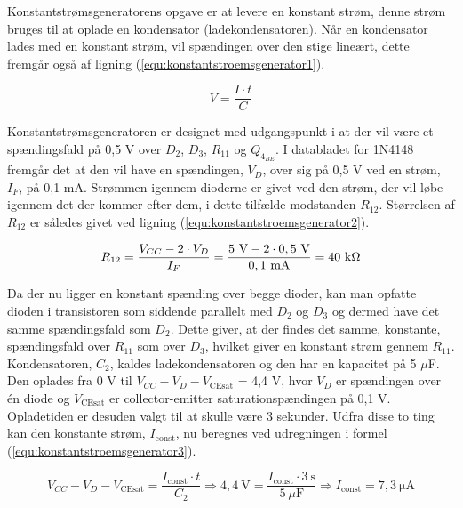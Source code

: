 Konstantstrømsgeneratorens opgave er at levere en konstant strøm, denne strøm bruges til at oplade en kondensator (ladekondensatoren). Når en kondensator lades med en konstant strøm, vil spændingen over den stige lineært, dette fremgår også af ligning (\ref{equ:konstantstroemsgenerator1}).

\begin{equation}
\label{equ:konstantstroemsgenerator1}
V = \frac{I \cdot t}{C}
\end{equation}

Konstantstrømsgeneratoren er designet med udgangspunkt i at der vil være et spændingsfald på 0,5 V over $D_2$, $D_3$, $R_{11}$ og $Q_{4_{BE}}$. I databladet for 1N4148 fremgår det at den vil have en spændingen, $V_D$, over sig på 0,5 V ved en strøm, $I_F$, på 0,1 mA. Strømmen igennem dioderne er givet ved den strøm, der vil løbe igennem det der kommer efter dem, i dette tilfælde modstanden $R_{12}$. Størrelsen af $R_{12}$ er således givet ved ligning (\ref{equ:konstantstroemsgenerator2}).

\begin{equation}
\label{equ:konstantstroemsgenerator2}
R_{12} = \frac{V_{CC} - 2 \cdot V_D}{I_F} = \mathrm{\frac{5~V - 2 \cdot 0,5~V}{0,1~mA} = 40~k\ohm}
\end{equation}

Da der nu ligger en konstant spænding over begge dioder, kan man opfatte dioden i transistoren som siddende parallelt med $D_2$ og $D_3$ og dermed have det samme spændingsfald som $D_2$. Dette giver, at der findes det samme, konstante, spændingsfald over $R_{11}$ som over $D_3$, hvilket giver en konstant strøm gennem $R_{11}$.
Kondensatoren, $C_2$, kaldes ladekondensatoren og den har en kapacitet på 5 $\mu$F.  Den oplades fra 0 V til $V_{CC} - V_D - V_{\mathrm{CEsat}}$ = 4,4 V, hvor $V_D$ er spændingen over én diode og $V_{\mathrm{CEsat}}$ er collector-emitter saturationspændingen på 0,1 V. Opladetiden er desuden valgt til at skulle være 3 sekunder. Udfra disse to ting kan den konstante strøm, $I_{\mathrm{const}}$, nu beregnes ved udregningen i formel (\ref{equ:konstantstroemsgenerator3}).

\begin{equation}
\label{equ:konstantstroemsgenerator3}
V_{CC} - V_D - V_{\mathrm{CEsat}} = \frac{I_{\mathrm{const}} \cdot t}{C_2} \Rightarrow \mathrm{4,4~V} = \frac{I_{\mathrm{const}} \cdot 3~\mathrm{s}}{5~\mu \mathrm{F}} \Rightarrow I_{\mathrm{const}} = \mathrm{7,3~\mu A}
\end{equation}

